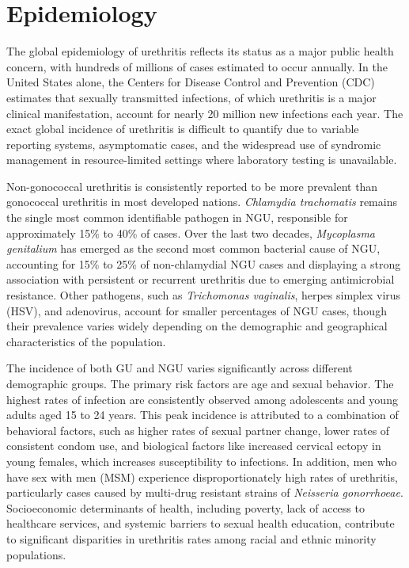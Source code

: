 \section*{Epidemiology}
The global epidemiology of urethritis reflects its status as a major public health concern, with hundreds of millions of cases estimated to occur annually. In the United States alone, the Centers for Disease Control and Prevention (CDC) estimates that sexually transmitted infections, of which urethritis is a major clinical manifestation, account for nearly 20 million new infections each year. The exact global incidence of urethritis is difficult to quantify due to variable reporting systems, asymptomatic cases, and the widespread use of syndromic management in resource-limited settings where laboratory testing is unavailable.

Non-gonococcal urethritis is consistently reported to be more prevalent than gonococcal urethritis in most developed nations. \textit{Chlamydia trachomatis} remains the single most common identifiable pathogen in NGU, responsible for approximately 15\% to 40\% of cases. Over the last two decades, \textit{Mycoplasma genitalium} has emerged as the second most common bacterial cause of NGU, accounting for 15\% to 25\% of non-chlamydial NGU cases and displaying a strong association with persistent or recurrent urethritis due to emerging antimicrobial resistance. Other pathogens, such as \textit{Trichomonas vaginalis}, herpes simplex virus (HSV), and adenovirus, account for smaller percentages of NGU cases, though their prevalence varies widely depending on the demographic and geographical characteristics of the population.

The incidence of both GU and NGU varies significantly across different demographic groups. The primary risk factors are age and sexual behavior. The highest rates of infection are consistently observed among adolescents and young adults aged 15 to 24 years. This peak incidence is attributed to a combination of behavioral factors, such as higher rates of sexual partner change, lower rates of consistent condom use, and biological factors like increased cervical ectopy in young females, which increases susceptibility to infections. In addition, men who have sex with men (MSM) experience disproportionately high rates of urethritis, particularly cases caused by multi-drug resistant strains of \textit{Neisseria gonorrhoeae}. Socioeconomic determinants of health, including poverty, lack of access to healthcare services, and systemic barriers to sexual health education, contribute to significant disparities in urethritis rates among racial and ethnic minority populations.


